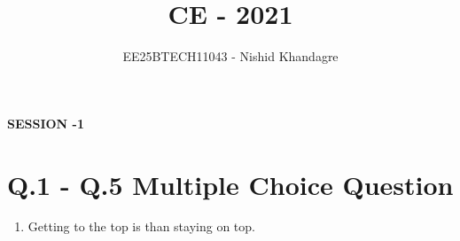 \documentclass[journal,12pt,onecolumn]{article}
\theoremstyle{remark}
\begin{document}
\title{CE - 2021}
\author{EE25BTECH11043 - Nishid Khandagre}
\date{}
\maketitle

\renewcommand{\thefigure}{\theenumi}
\renewcommand{\thetable}{\theenumi}

\textbf{SESSION -1}
\section*{Q.1 - Q.5 Multiple Choice Question}
\begin{enumerate}
\item Getting to the top is \underline{\hspace{2cm}} than staying on top.

\hfill{}
\begin{enumerate}
\end{enumerate}


\end{enumerate}
\end{document}
